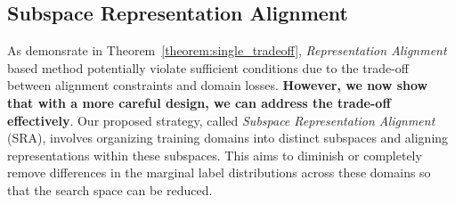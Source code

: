 \subsection{Subspace Representation Alignment}

As demonsrate in Theorem~\ref{theorem:single_tradeoff}, \textit{Representation Alignment} based method potentially violate sufficient conditions due to the  trade-off between alignment constraints and domain losses. \textbf{However, we now show that with a more careful design, we can address the trade-off effectively}. Our proposed strategy, called \textit{Subspace Representation Alignment} (SRA), involves organizing training domains into distinct subspaces and aligning representations within these subspaces. 
This aims to diminish or completely remove differences in the marginal label distributions across these domains so that the search space can be reduced. 

